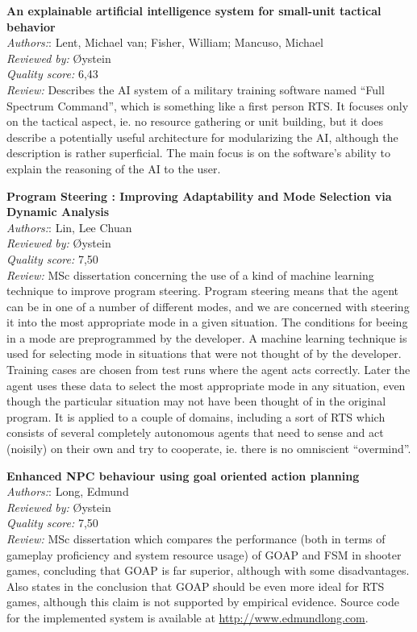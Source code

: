 \textbf{An explainable artificial intelligence system for small-unit tactical behavior}\\
\textit{Authors:}: Lent, Michael van; Fisher, William; Mancuso, Michael\\
\textit{Reviewed by:} {\O}ystein\\
\textit{Quality score:} 6,43\\
\textit{Review:} Describes the AI system of a military training software named ``Full Spectrum Command'', which is something like a first person RTS. It focuses only on the tactical aspect, ie. no resource gathering or unit building, but it does describe a potentially useful architecture for modularizing the AI, although the description is rather superficial. The main focus is on the software's ability to explain the reasoning of the AI to the user.

\textbf{Program Steering : Improving Adaptability and Mode Selection via Dynamic Analysis}\\
\textit{Authors:}: Lin, Lee Chuan\\
\textit{Reviewed by:} {\O}ystein\\
\textit{Quality score:} 7,50\\
\textit{Review:} MSc dissertation concerning the use of a kind of machine learning technique to improve program steering. Program steering means that the agent can be in one of a number of different modes, and we are concerned with steering it into the most appropriate mode in a given situation. The conditions for beeing in a mode are preprogrammed by the developer. A machine learning technique is used for selecting mode in situations that were not thought of by the developer. Training cases are chosen from test runs where the agent acts correctly. Later the agent uses these data to select the most appropriate mode in any situation, even though the particular situation may not have been thought of in the original program. It is applied to a couple of domains, including a sort of RTS which consists of several completely autonomous agents that need to sense and act (noisily) on their own and try to cooperate, ie. there is no omniscient ``overmind''.

\textbf{Enhanced NPC behaviour using goal oriented action planning}\\
\textit{Authors:}: Long, Edmund\\
\textit{Reviewed by:} {\O}ystein\\
\textit{Quality score:} 7,50\\
\textit{Review:} MSc dissertation which compares the performance (both in terms of gameplay proficiency and system resource usage) of GOAP and FSM in shooter games, concluding that GOAP is far superior, although with some disadvantages. Also states in the conclusion that GOAP should be even more ideal for RTS games, although this claim is not supported by empirical evidence. Source code for the implemented system is available at \url{http://www.edmundlong.com}.


